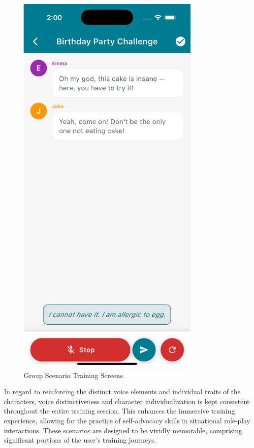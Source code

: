 \documentclass[MScCS]{uccthesis}
\begin{document}
\begin{figure}[htbp]
\begin{minipage}[b]{0.45\textwidth}
    \end{minipage}
    \hfill
    \begin{minipage}[b]{0.45\textwidth}
        \centering
        \includegraphics[width=0.8\textwidth,height=0.45\textheight,keepaspectratio]{Figures/group_training_user_speech.png}
    \end{minipage}
    \caption{Group Scenario Training Screens}
    \label{fig:group_training}
\end{figure}

In regard to reinforcing the distinct voice elements and individual traits of the characters, voice distinctiveness and character individualization is kept consistent throughout the entire training session. This enhances the immersive training experience, allowing for the practice of self-advocacy skills in situational role-play interactions. These scenarios are designed to be vividly memorable, comprising significant portions of the user's training journeys.  
\end{document}
